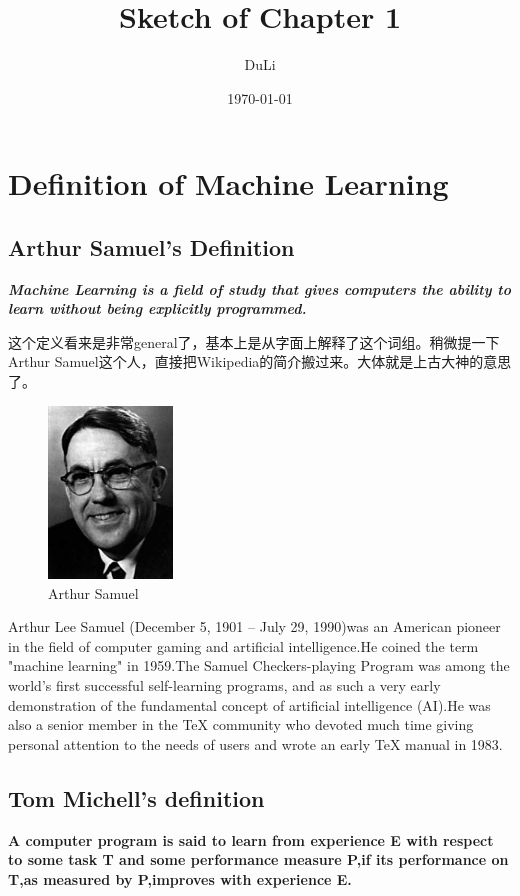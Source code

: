 \documentclass[UTF8]{ctexart}
\title{Sketch of Chapter 1}
\author{DuLi}
\date{\today}
\begin{document}
\maketitle
\newpage
\tableofcontents
\newpage
\section{Definition of Machine Learning}
\subsection{Arthur Samuel's Definition}
\setlength{\parskip}{0.5em} 

\large \textbf{\emph{Machine Learning is a field of study that gives computers the ability to learn without being explicitly programmed.}}

这个定义看来是非常general了，基本上是从字面上解释了这个词组。稍微提一下Arthur Samuel这个人，直接把Wikipedia的简介搬过来。大体就是上古大神的意思了。

\begin{figure}[H]
\centering
\includegraphics[width = 1.3in]{This_is_the_photo_of_Arthur_Samuel.jpg}
\caption{Arthur Samuel}
\end{figure}

Arthur Lee Samuel (December 5, 1901 – July 29, 1990)was an American pioneer in the field of computer gaming and artificial intelligence.He coined the term "machine learning" in 1959.The Samuel Checkers-playing Program was among the world's first successful self-learning programs, and as such a very early demonstration of the fundamental concept of artificial intelligence (AI).He was also a senior member in the TeX community who devoted much time giving personal attention to the needs of users and wrote an early TeX manual in 1983.

\subsection{Tom Michell's definition}
\large \textbf{A computer program is said to learn from experience E with respect to some task T and some performance measure P,if its performance on T,as measured by P,improves with experience E.}
\end{document}
